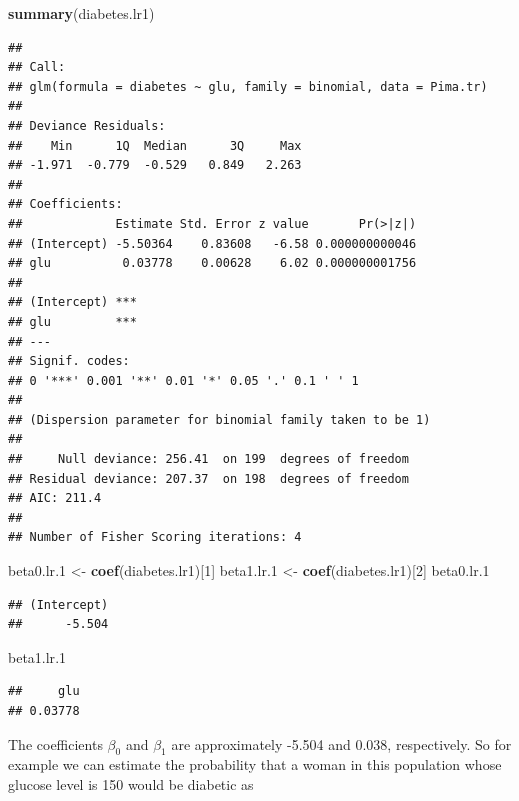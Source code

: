 \documentclass[
]{krantz}
\newenvironment{Shaded}{\begin{snugshade}}{\end{snugshade}}
\newcommand{\DecValTok}[1]{\textcolor[rgb]{0.00,0.00,0.81}{#1}}
\newcommand{\FloatTok}[1]{\textcolor[rgb]{0.00,0.00,0.81}{#1}}
\newcommand{\KeywordTok}[1]{\textcolor[rgb]{0.13,0.29,0.53}{\textbf{#1}}}
\newcommand{\NormalTok}[1]{#1}
\newcommand{\StringTok}[1]{\textcolor[rgb]{0.31,0.60,0.02}{#1}}
\begin{document}
\begin{Shaded}
\begin{Highlighting}[]
\KeywordTok{summary}\NormalTok{(diabetes.lr1)}
\end{Highlighting}
\end{Shaded}

\begin{verbatim}
## 
## Call:
## glm(formula = diabetes ~ glu, family = binomial, data = Pima.tr)
## 
## Deviance Residuals: 
##    Min      1Q  Median      3Q     Max  
## -1.971  -0.779  -0.529   0.849   2.263  
## 
## Coefficients:
##             Estimate Std. Error z value       Pr(>|z|)
## (Intercept) -5.50364    0.83608   -6.58 0.000000000046
## glu          0.03778    0.00628    6.02 0.000000001756
##                
## (Intercept) ***
## glu         ***
## ---
## Signif. codes:  
## 0 '***' 0.001 '**' 0.01 '*' 0.05 '.' 0.1 ' ' 1
## 
## (Dispersion parameter for binomial family taken to be 1)
## 
##     Null deviance: 256.41  on 199  degrees of freedom
## Residual deviance: 207.37  on 198  degrees of freedom
## AIC: 211.4
## 
## Number of Fisher Scoring iterations: 4
\end{verbatim}

\begin{Shaded}
\begin{Highlighting}[]
\NormalTok{beta0.lr}\FloatTok{.1}\NormalTok{ \textless{}{-}}\StringTok{ }\KeywordTok{coef}\NormalTok{(diabetes.lr1)[}\DecValTok{1}\NormalTok{]}
\NormalTok{beta1.lr}\FloatTok{.1}\NormalTok{ \textless{}{-}}\StringTok{ }\KeywordTok{coef}\NormalTok{(diabetes.lr1)[}\DecValTok{2}\NormalTok{]}
\NormalTok{beta0.lr}\FloatTok{.1}
\end{Highlighting}
\end{Shaded}

\begin{verbatim}
## (Intercept) 
##      -5.504
\end{verbatim}

\begin{Shaded}
\begin{Highlighting}[]
\NormalTok{beta1.lr}\FloatTok{.1}
\end{Highlighting}
\end{Shaded}

\begin{verbatim}
##     glu 
## 0.03778
\end{verbatim}

The coefficients \(\beta_0\) and \(\beta_1\) are approximately -5.504 and
0.038, respectively. So for example we can estimate the probability that a woman in this population whose glucose level is 150 would be diabetic as
\end{document}
